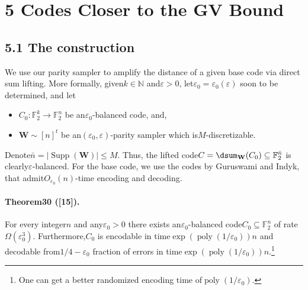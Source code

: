 \section*{5 Codes Closer to the GV Bound}
\subsection*{5.1 The construction}
We use our parity sampler to amplify the distance of a given base code via direct sum lifting. More formally, given$k\in\mathbb N$ and$\varepsilon>0$, let$\varepsilon_0=\varepsilon_0(\varepsilon)$ soon to be determined, and let
\begin{itemize}
\item $C_0:\mathbb F_2^k\to\mathbb F_2^n$ be an$\varepsilon_0$-balanced code, and,
\item $\mathbf W\sim[n]^t$ be an$(\varepsilon_0,\varepsilon)$-parity sampler which is$M$-discretizable.
\end{itemize}
Denote$\bar n=|\operatorname{Supp}(\mathbf W)|\leq M$. Thus, the lifted code$C=\dsum_{\mathbf W}(C_0)\subseteq\mathbb F_2^{\bar n}$ is clearly$\varepsilon$-balanced. For the base code, we use the codes by Guruswami and Indyk, that admit$O_{\varepsilon_0}(n)$-time encoding and decoding.
\paragraph{Theorem30 ([15]).} For every integer$n$ and any$\varepsilon_0>0$ there exists an$\varepsilon_0$-balanced code$C_0\subseteq\mathbb F_2^n$ of rate$\Omega(\varepsilon_0^3)$. Furthermore,$C_0$ is encodable in time$\exp(\operatorname{poly}(1/\varepsilon_0))n$ and decodable from$1/4-\varepsilon_0$ fraction of errors in time$\exp(\operatorname{poly}(1/\varepsilon_0))n$.\footnote{One can get a better randomized encoding time of$\operatorname{poly}(1/\varepsilon_0)$.}
